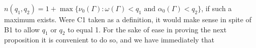 $n(q_1, q_2) = 1 + \max\{\nu_0(\Gamma): \omega(\Gamma) < q_1 \text{ and } \alpha_0(\Gamma) < q_2\}$, if such a maximum exists. Were C1 taken as a definition, it would make sense in spite of B1 to allow $q_1$ or $q_2$ to equal 1. For the sake of ease in proving the next proposition it is convenient to do so, and we have immediately that
